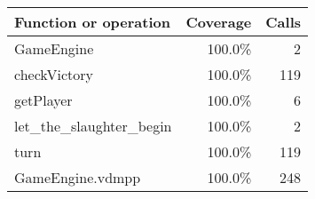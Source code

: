 \bigskip
\begin{longtable}{|l|r|r|}
\hline
Function or operation & Coverage & Calls \\
\hline
\hline
GameEngine & 100.0\% & 2 \\
\hline
checkVictory & 100.0\% & 119 \\
\hline
getPlayer & 100.0\% & 6 \\
\hline
let\_the\_slaughter\_begin & 100.0\% & 2 \\
\hline
turn & 100.0\% & 119 \\
\hline
\hline
GameEngine.vdmpp & 100.0\% & 248 \\
\hline
\end{longtable}

